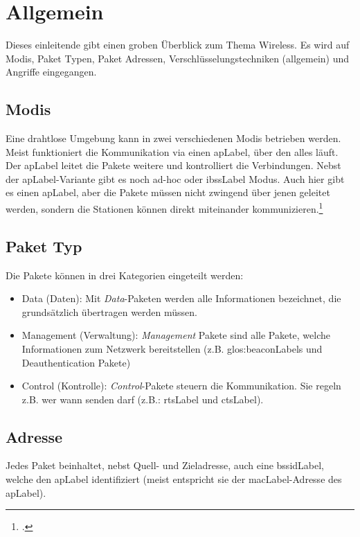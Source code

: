 
\chapter{Allgemein}
\label{ch:general}
Dieses einleitende  gibt einen groben Überblick zum Thema Wireless. Es wird auf Modis, Paket Typen, Paket Adressen, Verschlüsselungstechniken (allgemein) und Angriffe eingegangen.

\section{Modis}
Eine drahtlose Umgebung kann in zwei verschiedenen Modis betrieben werden.
Meist funktioniert die Kommunikation via einen \gls{apLabel}, über den alles läuft. Der \gls{apLabel} leitet die Pakete weitere und kontrolliert die Verbindungen.
Nebst der \gls{apLabel}-Variante gibt es noch ad-hoc oder \gls{ibssLabel} Modus. Auch hier gibt es einen \gls{apLabel}, aber die Pakete müssen nicht zwingend über jenen geleitet werden, sondern die Stationen können direkt miteinander kommunizieren.\footcite[][38]{WrightCache201503}

\section{Paket Typ}
Die Pakete können in drei Kategorien eingeteilt werden:
\begin{itemize}
	\item Data (Daten): Mit \textit{Data}-Paketen werden alle Informationen bezeichnet, die grundsätzlich übertragen werden müssen.
	\item Management (Verwaltung): \textit{Management} Pakete sind alle Pakete, welche Informationen zum Netzwerk bereitstellen (z.B. \glspl{glos:beaconLabel} und Deauthentication Pakete)
	\item Control (Kontrolle): \textit{Control}-Pakete steuern die Kommunikation. Sie regeln z.B. wer wann senden darf (z.B.: \gls{rtsLabel} und \gls{ctsLabel}).
\end{itemize}

\section{Adresse}
Jedes Paket beinhaltet, nebst Quell- und Zieladresse, auch eine \gls{bssidLabel}, welche den \gls{apLabel} identifiziert (meist entspricht sie der \gls{macLabel}-Adresse des \gls{apLabel}).


